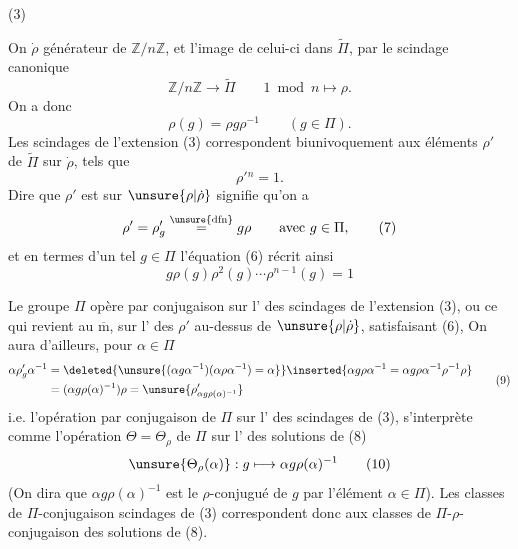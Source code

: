 (3) 

On  $\dot\rho$  générateur de $\mathbb Z/n\mathbb Z$, et   l'image de celui-ci dans $\widetilde\Pi$, par le scindage canonique 
\[
\mathbb Z/n\mathbb Z\longrightarrow\widetilde\Pi\qquad 1\bmod n\longmapsto\rho. \tag{4}
\]
On a donc
\[
\rho(g)=\rho g\rho^{-1}\qquad(g\in\Pi). \tag{5}
\]
Les scindages de l'extension (3) correspondent biunivoquement aux éléments $\rho'$ de $\widetilde\Pi$ sur $\dot\rho$, tels que
\[
\rho'{}^n=1. \tag{6}
\]
Dire que $\rho'$ est sur $\unsure{\rho|\dot\rho}$ signifie qu'on a
\[
\rho'=\rho'_g\overset{\unsure{\mathrm{dfn}}}{=}g\rho\qquad\text{avec }g\in\Pi, \tag{7}
\]
et en termes d'un tel $g\in\Pi$ l'équation (6)  récrit ainsi
\[
\boxed{g\rho(g)\rho^2(g)\cdots\rho^{n-1}(g)=1} \tag{8}
\]






Le groupe $\Pi$ opère par conjugaison sur l' des scindages de l'extension (3), ou ce qui revient au $\overline{\mathrm m}$, sur l' des $\rho'$ au-dessus de $\unsure{\rho|\dot\rho}$, satisfaisant (6),  On aura d'ailleurs, pour $\alpha\in\Pi$
\[
\begin{aligned}
\alpha\rho'_g\alpha^{-1}
&=\deleted{\unsure{(\alpha g\alpha^{-1})(\alpha\rho\alpha^{-1})=\alpha}}\inserted{\alpha g\rho\alpha^{-1}=\alpha g\rho\alpha^{-1}\rho^{-1}\rho}\\
&=(\alpha g\rho(\alpha)^{-1})\rho
=\unsure{\rho'_{\alpha g\rho(\alpha)^{-1}}}
\end{aligned}\tag{9}
\]
i.e. l'opération par conjugaison de $\Pi$ sur l' des scindages de (3), s'interprète comme l'opération $\Theta=\Theta_\rho$ de $\Pi$ sur l' des solutions de (8) 
\[
\unsure{\Theta_\rho(\alpha)}:g\longmapsto\alpha g\rho(\alpha)^{-1} \tag{10}
\]
(On dira que $\alpha g\rho(\alpha)^{-1}$ est le $\rho$-conjugué de $g$ par l'élément $\alpha\in\Pi$). Les classes de $\Pi$-conjugaison  scindages de (3) correspondent donc aux classes de $\Pi$-$\rho$-conjugaison des solutions de (8).

